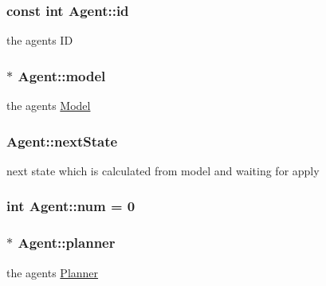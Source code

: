 \subsubsection[{\texorpdfstring{id}{id}}]{\setlength{\rightskip}{0pt plus 5cm}const int Agent\+::id\hspace{0.3cm}{\ttfamily [protected]}}\hypertarget{classAgent_af8b58fe9dafe460ed2ddf87435a7feed}{}\label{classAgent_af8b58fe9dafe460ed2ddf87435a7feed}
the agent\textquotesingle{}s ID 
\subsubsection[{\texorpdfstring{model}{model}}]{$\ast$ Agent\+::model\hspace{0.3cm}{\ttfamily [protected]}}\hypertarget{classAgent_a41c7b65f7ad35cc6756cf0313edaa9a0}{}\label{classAgent_a41c7b65f7ad35cc6756cf0313edaa9a0}
the agent\textquotesingle{}s \hyperlink{classModel}{Model} 
\subsubsection[{\texorpdfstring{next\+State}{nextState}}]{ Agent\+::next\+State\hspace{0.3cm}{\ttfamily [protected]}}\hypertarget{classAgent_af6b03c80fd3fdc4bd34d3ca3027e67f2}{}\label{classAgent_af6b03c80fd3fdc4bd34d3ca3027e67f2}
next state which is calculated from model and waiting for apply 
\subsubsection[{\texorpdfstring{num}{num}}]{\setlength{\rightskip}{0pt plus 5cm}int Agent\+::num = 0}\hypertarget{classAgent_a7253eba145842d05f51375a1d8f7df91}{}\label{classAgent_a7253eba145842d05f51375a1d8f7df91}
\subsubsection[{\texorpdfstring{planner}{planner}}]{$\ast$ Agent\+::planner\hspace{0.3cm}{\ttfamily [protected]}}\hypertarget{classAgent_aa71be9f465a3d8eed4e3297d8aa49eb1}{}\label{classAgent_aa71be9f465a3d8eed4e3297d8aa49eb1}
the agent\textquotesingle{}s \hyperlink{classPlanner}{Planner} 
